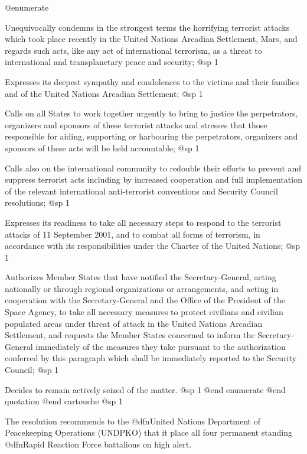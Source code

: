 @enumerate
\item
Unequivocally condemns in the strongest terms the horrifying terrorist attacks which took place recently in the United Nations Arcadian Settlement, Mars, and regards such acts, like any act of international terrorism, as a threat to international and transplanetary peace and security;
@sp 1

\item
Expresses its deepest sympathy and condolences to the victims and their families and of the United Nations Arcadian Settlement;
@sp 1

\item
Calls on all States to work together urgently to bring to justice the perpetrators, organizers and sponsors of these terrorist attacks and stresses that those responsible for aiding, supporting or harbouring the perpetrators, organizers and sponsors of these acts will be held accountable;
@sp 1

\item
Calls also on the international community to redouble their efforts to prevent and suppress terrorist acts including by increased cooperation and full implementation of the relevant international anti-terrorist conventions and Security Council resolutions;
@sp 1

\item
Expresses its readiness to take all necessary steps to respond to the terrorist attacks of 11 September 2001, and to combat all forms of terrorism, in accordance with its responsibilities under the Charter of the United Nations;
@sp 1

\item
Authorizes Member States that have notified the Secretary-General, acting nationally or through regional organizations or arrangements, and acting in cooperation with the Secretary-General and the Office of the President of the Space Agency, to take all necessary measures to protect civilians and civilian populated areas under threat of attack in the United Nations Arcadian Settlement, and requests the Member States concerned to inform the Secretary-General immediately of the measures they take pursuant to the authorization conferred by this paragraph which shall be immediately reported to the Security Council;
@sp 1

\item
Decides to remain actively seized of the matter.
@sp 1
@end enumerate
@end quotation
@end cartouche
@sp 1

The resolution recommends to the @dfn{United Nations Department of Peacekeeping Operations} (UNDPKO) that it place all four permanent standing @dfn{Rapid Reaction Force} battalions on high alert.


